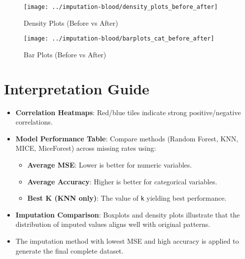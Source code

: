 \documentclass[
]{article}
\providecommand{\tightlist}{%
  \setlength{\itemsep}{0pt}\setlength{\parskip}{0pt}}
\begin{document}
\begin{figure}[H]

{\centering \texttt{[image: ../imputation-blood/density\_plots\_before\_after]} 

}

\caption{Density Plots (Before vs After)}\label{fig:show-densityplot}
\end{figure}

\begin{figure}[H]

{\centering \texttt{[image: ../imputation-blood/barplots\_cat\_before\_after]} 

}

\caption{Bar Plots (Before vs After)}\label{fig:show-barplot}
\end{figure}

\section{Interpretation Guide}\label{interpretation-guide}

\begin{itemize}
\tightlist
\item
  \textbf{Correlation Heatmaps}: Red/blue tiles indicate strong
  positive/negative correlations.
\item
  \textbf{Model Performance Table}: Compare methods (Random Forest, KNN,
  MICE, MiceForest) across missing rates using:

  \begin{itemize}
  \tightlist
  \item
    \textbf{Average MSE}: Lower is better for numeric variables.
  \item
    \textbf{Average Accuracy}: Higher is better for categorical
    variables.
  \item
    \textbf{Best K (KNN only)}: The value of \texttt{k} yielding best
    performance.
  \end{itemize}
\item
  \textbf{Imputation Comparison}: Boxplots and density plots illustrate
  that the distribution of imputed values aligns well with original
  patterns.
\item
  The imputation method with lowest MSE and high accuracy is applied to
  generate the final complete dataset.
\end{itemize}
\end{document}
